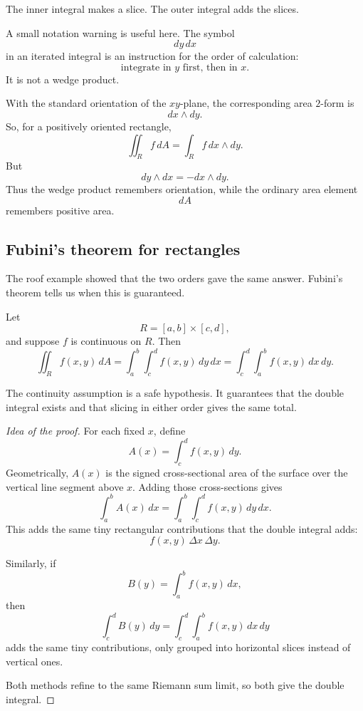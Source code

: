 The inner integral makes a slice.  The outer integral adds the slices.

A small notation warning is useful here.  The symbol
\[
    dy\,dx
\]
in an iterated integral is an instruction for the order of calculation:
\[
    \text{integrate in }y\text{ first, then in }x.
\]
It is not a wedge product.

With the standard orientation of the \(xy\)-plane, the corresponding area \(2\)-form is
\[
    dx\wedge dy.
\]
So, for a positively oriented rectangle,
\[
    \iint_R f\,dA
    =
    \int_R f\,dx\wedge dy.
\]
But
\[
    dy\wedge dx=-dx\wedge dy.
\]
Thus the wedge product remembers orientation, while the ordinary area element
\[
    dA
\]
remembers positive area.

\subsection{Fubini's theorem for rectangles}

The roof example showed that the two orders gave the same answer.  Fubini's theorem
tells us when this is guaranteed.

\begin{theorem}
Let
\[
    R=[a,b]\times[c,d],
\]
and suppose \(f\) is continuous on \(R\).  Then
\[
\boxed{
    \iint_R f(x,y)\,dA
    =
    \int_a^b\int_c^d f(x,y)\,dy\,dx
    =
    \int_c^d\int_a^b f(x,y)\,dx\,dy.
}
\]
\end{theorem}

The continuity assumption is a safe hypothesis.  It guarantees that the double integral
exists and that slicing in either order gives the same total.

\begin{proof}[Idea of the proof]
For each fixed \(x\), define
\[
    A(x)=\int_c^d f(x,y)\,dy.
\]
Geometrically, \(A(x)\) is the signed cross-sectional area of the surface over the vertical
line segment above \(x\).  Adding those cross-sections gives
\[
    \int_a^b A(x)\,dx
    =
    \int_a^b\int_c^d f(x,y)\,dy\,dx.
\]
This adds the same tiny rectangular contributions that the double integral adds:
\[
    f(x,y)\,\Delta x\,\Delta y.
\]

Similarly, if
\[
    B(y)=\int_a^b f(x,y)\,dx,
\]
then
\[
    \int_c^d B(y)\,dy
    =
    \int_c^d\int_a^b f(x,y)\,dx\,dy
\]
adds the same tiny contributions, only grouped into horizontal slices instead of vertical
ones.

Both methods refine to the same Riemann sum limit, so both give the double integral.
\end{proof}

